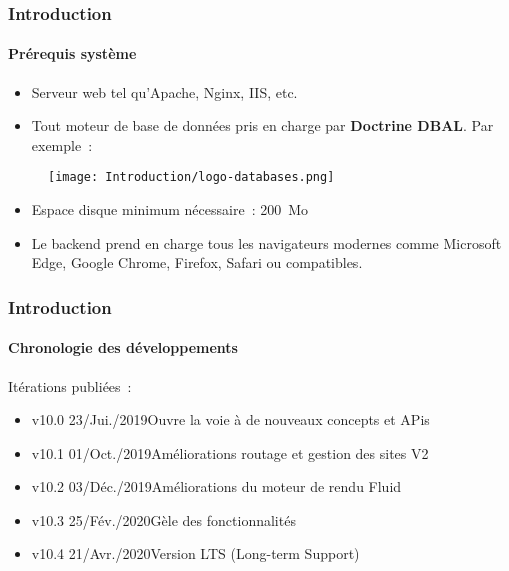 
\begin{frame}[fragile]
	\frametitle{Introduction}
	\framesubtitle{Prérequis système}

	\begin{itemize}
		\item Serveur web tel qu'Apache, Nginx, IIS, etc.
		\item Tout moteur de base de données pris en charge par \textbf{Doctrine DBAL}.
			Par exemple~:
	\end{itemize}

	\begin{figure}
		\texttt{[image: Introduction/logo-databases.png]}
	\end{figure}

	\begin{itemize}
		\item Espace disque minimum nécessaire~: 200~Mo
		\item Le backend prend en charge tous les navigateurs modernes comme Microsoft Edge,
			Google Chrome, Firefox, Safari ou compatibles.
	\end{itemize}

\end{frame}


\begin{frame}[fragile]
	\frametitle{Introduction}
	\framesubtitle{Chronologie des développements}

	Itérations publiées~:
	\vspace{0.4cm}
	\begin{itemize}
		\item v10.0 \tabto{1.1cm}23/Jui./2019\tabto{3.4cm}Ouvre la voie à de nouveaux concepts et APis
		\item v10.1 \tabto{1.1cm}01/Oct./2019\tabto{3.4cm}Améliorations routage et gestion des sites V2
		\item v10.2 \tabto{1.1cm}03/Déc./2019\tabto{3.4cm}Améliorations du moteur de rendu Fluid
		\item v10.3 \tabto{1.1cm}25/Fév./2020\tabto{3.4cm}Gèle des fonctionnalités
		\item v10.4 \tabto{1.1cm}21/Avr./2020\tabto{3.4cm}Version LTS (Long-term Support)
	\end{itemize}

\end{frame}

